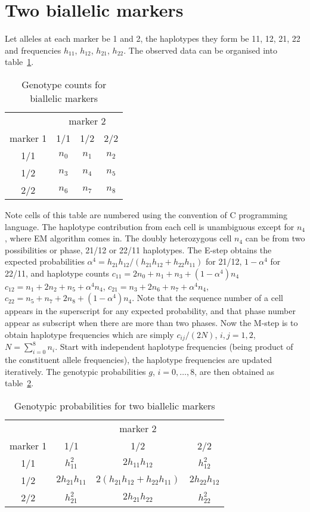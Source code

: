 \section*{Two biallelic markers}

Let alleles at each marker be 1 and 2, the haplotypes they form be 11, 12, 21,
22 and frequencies $h_{11}$, $h_{12}$, $h_{21}$, $h_{22}$.  The observed data
can be organised into table~\ref{twotwon}.

\begin{table}[h]
\centering
\caption{Genotype counts for biallelic markers\label{twotwon}}
\vskip 0.3cm
\begin{tabular}{cccc}
\hline
     & \multicolumn{3}{c}{marker 2} \\ \cline{2-4}
marker 1  & 1/1 & 1/2 & 2/2\\
\hline
1/1  &  $n_0$ & $n_1$ & $n_2$\\
1/2  &  $n_3$ & $n_4$ & $n_5$\\
2/2  &  $n_6$ & $n_7$ & $n_8$\\
\hline
\end{tabular}
\end{table}

Note cells of this table are numbered using the convention of C programming
language.  The haplotype contribution from each cell is unambiguous except for
$n_4$, where EM algorithm comes in.  The doubly heterozygous cell $n_4$ can be
from two possibilities or phase, 21/12 or 22/11 haplotypes.  The E-step obtains
the expected probabilities $\alpha^4=h_{21} h_{12}/(h_{21} h_{12}+h_{22}
h_{11})$ for 21/12, $1-\alpha^4$ for 22/11, and haplotype counts
$c_{11} = 2 n_{0}+n_{1}+n_{3}+(1-\alpha^4) n_{4}$ $c_{12} = n_{1}+2
n_{2}+n_{5}+\alpha^4 n_{4}$, $c_{21} = n_{3}+2 n_{6}+n_{7}+\alpha^4 n_{4}$,
$c_{22} = n_{5}+n_{7}+2 n_{8}+(1-\alpha^4) n_{4}$.  Note that the sequence
number of a cell appears in the superscript for any expected probability, and
that phase number appear as subscript when there are more than two phases.  Now
the M-step is to obtain haplotype frequencies which are simply $c_{ij}/(2N)$,
$i,j=1,2$, $N=\sum_{i=0}^8n_i$.  Start with independent haplotype frequencies
(being product of the constituent allele frequencies), the haplotype
frequencies are updated iteratively.  The genotypic probabilities $g$,
$i=0,\ldots,8$, are then obtained as table~\ref{twotwog}.

\begin{table}[h]
\centering
\caption{Genotypic probabilities for two biallelic markers\label{twotwog}}
\vskip 0.3cm
\begin{tabular}{cccc}
\hline
     & \multicolumn{3}{c}{marker 2}\\ \cline{2-4}
marker 1 & 1/1 & 1/2 & 2/2\\
\hline
1/1  & $h_{11}^2$     & $2 h_{11} h_{12}$ & $h_{12}^2$ \\
1/2  & $2 h_{21} h_{11}$ & $2 (h_{21} h_{12}+h_{22} h_{11})$ & $2 h_{22} h_{12}$ \\
2/2  & $h_{21}^2$ & $2 h_{21} h_{22}$ & $h_{22}^2$ \\
\hline
\end{tabular}
\end{table}

